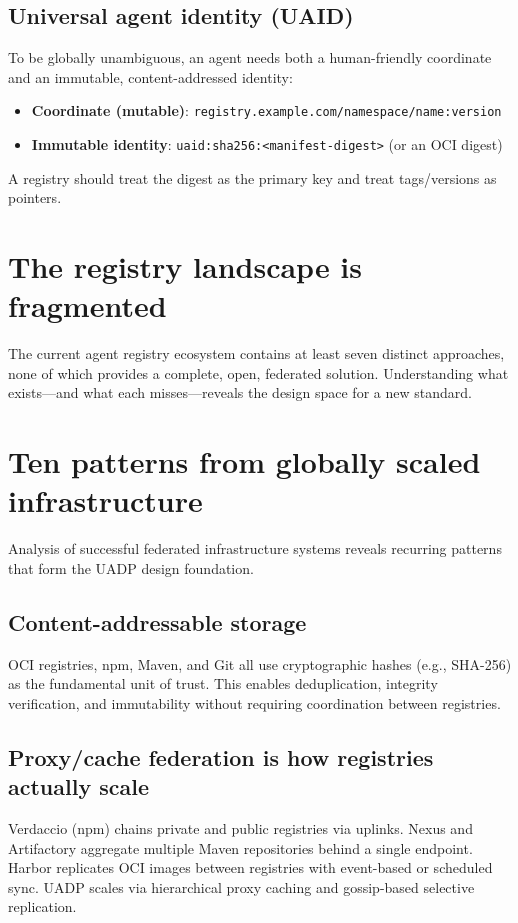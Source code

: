 \documentclass[11pt]{article}
\begin{document}
\subsection{Universal agent identity (UAID)}
To be globally unambiguous, an agent needs both a human-friendly coordinate and an immutable, content-addressed identity:
\begin{itemize}
  \item \textbf{Coordinate (mutable)}: \texttt{registry.example.com/namespace/name:version}
  \item \textbf{Immutable identity}: \texttt{uaid:sha256:<manifest-digest>} (or an OCI digest)
\end{itemize}

A registry should treat the digest as the primary key and treat tags/versions as pointers.

\section{The registry landscape is fragmented}
The current agent registry ecosystem contains at least seven distinct approaches, none of which provides a complete, open, federated solution. Understanding what exists---and what each misses---reveals the design space for a new standard.

\section{Ten patterns from globally scaled infrastructure}
Analysis of successful federated infrastructure systems reveals recurring patterns that form the UADP design foundation.

\subsection{Content-addressable storage}
OCI registries, npm, Maven, and Git all use cryptographic hashes (e.g., SHA-256) as the fundamental unit of trust. This enables deduplication, integrity verification, and immutability without requiring coordination between registries.

\subsection{Proxy/cache federation is how registries actually scale}
Verdaccio (npm) chains private and public registries via uplinks. Nexus and Artifactory aggregate multiple Maven repositories behind a single endpoint. Harbor replicates OCI images between registries with event-based or scheduled sync. UADP scales via hierarchical proxy caching and gossip-based selective replication.
\end{document}
